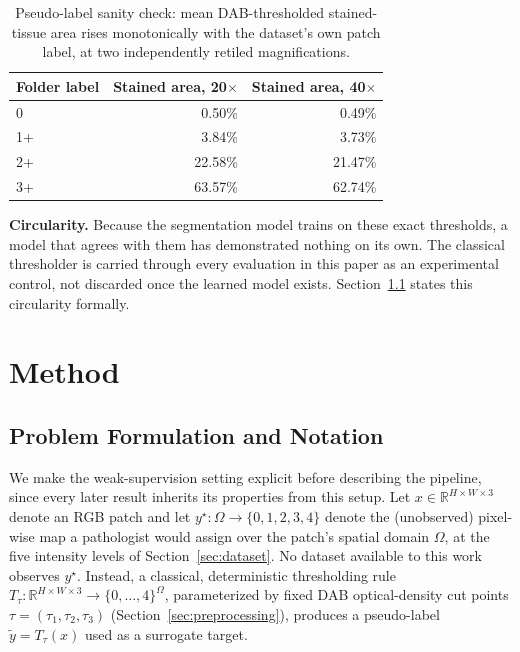 \documentclass[conference]{IEEEtran}
\begin{document}
\begin{table}[t]
\centering
\caption{Pseudo-label sanity check: mean DAB-thresholded stained-tissue
area rises monotonically with the dataset's own patch label, at two
independently retiled magnifications.}
\label{tab:sanity}
\begin{tabular}{lrr}
\toprule
Folder label & Stained area, 20$\times$ & Stained area, 40$\times$ \\
\midrule
0 & 0.50\% & 0.49\% \\
1+ & 3.84\% & 3.73\% \\
2+ & 22.58\% & 21.47\% \\
3+ & 63.57\% & 62.74\% \\
\bottomrule
\end{tabular}
\end{table}

\textbf{Circularity.} Because the segmentation model trains on these exact
thresholds, a model that agrees with them has demonstrated nothing on its
own. The classical thresholder is carried through every evaluation in this
paper as an experimental control, not discarded once the learned model
exists. Section~\ref{sec:formulation} states this circularity formally.

\section{Method}

\subsection{Problem Formulation and Notation}
\label{sec:formulation}

We make the weak-supervision setting explicit before describing the
pipeline, since every later result inherits its properties from this
setup. Let $x \in \mathbb{R}^{H \times W \times 3}$ denote an RGB patch and
let $y^\star : \Omega \to \{0,1,2,3,4\}$ denote the (unobserved) pixel-wise
map a pathologist would assign over the patch's spatial domain $\Omega$, at
the five intensity levels of Section~\ref{sec:dataset}. No dataset
available to this work observes $y^\star$. Instead, a classical,
deterministic thresholding rule $T_\tau: \mathbb{R}^{H\times W\times 3} \to
\{0,\ldots,4\}^\Omega$, parameterized by fixed DAB optical-density cut
points $\tau = (\tau_1,\tau_2,\tau_3)$ (Section~\ref{sec:preprocessing}),
produces a pseudo-label $\tilde y = T_\tau(x)$ used as a surrogate target.
\end{document}
